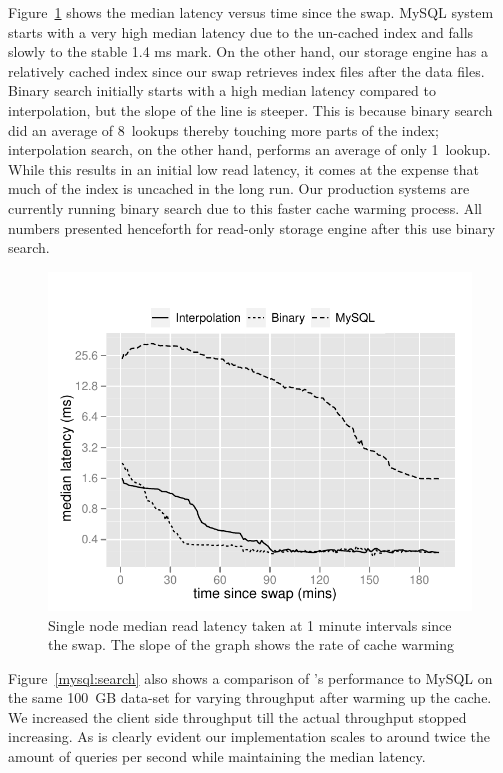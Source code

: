 Figure~\ref{search} shows the median latency versus time since the swap.
MySQL system starts with a very high median latency due to the un-cached
index and falls slowly to the stable 1.4 ms mark. On the other hand, our
storage engine has a relatively cached index since our swap retrieves index
files after the data files. Binary search initially starts with a high 
median latency compared to interpolation, but the slope of the line 
is steeper. This is because binary search did an average of 8~lookups 
thereby touching more parts of the index; interpolation search, on the 
other hand, performs an average of only 1~lookup. While this results 
in an initial low read latency, it comes at the expense that much of the 
index is uncached in the long run. Our production systems are currently 
running binary search due to this faster cache warming process. All numbers 
presented henceforth for read-only storage engine after this use binary search.  

\begin{figure}
  \centering
    \includegraphics[scale=0.55]{images/search_1node.pdf}
  \caption{Single node median read latency taken at 1 minute intervals since the swap. The slope of the graph shows the rate of cache warming}
  \label{search}
\end{figure}

Figure~\ref{mysql:search} also shows a comparison of \projectname's
performance to MySQL on the same 100~GB data-set for varying 
throughput after warming up the cache. We increased the client 
side throughput till the actual throughput stopped increasing. 
As is clearly evident our implementation scales to around twice
the amount of queries per second while maintaining the median latency. 

